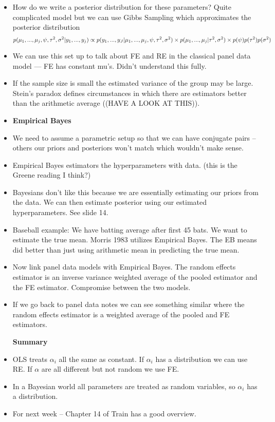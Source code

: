 \documentclass[12pt]{article}
\begin{document}
\begin{itemize}
      \item How do we write a posterior distribution for these parameters?
            Quite complicated model but we can use Gibbs Sampling which approximates the posterior distribution
            $$p(\mu_{1}, ..., \mu_{j}, \psi, \tau^{2}, \sigma^{2}|y_{1}, ..., y_{j}) \propto \\\\
                  p(y_{1}, ..., y_{J}|\mu_{1}, ..., \mu_{j}, \psi, \tau^{2}, \sigma^{2}) \times p(\mu_{1}, ..., \mu_{j}|\tau^{2}, \sigma^{2}) \times p(\psi)p(\tau^{2})p(\sigma^{2})$$

      \item We can use this set up to talk about FE and RE in the classical panel data model --- FE has constant mu's. Didn't understand this fully.
      \item If the sample size is small the estimated variance of the group may be large. Stein's paradox defines circumstances in which there are estimators better than the arithmetic average ((HAVE A LOOK AT THIS)).
      \item \textbf{Empirical Bayes}
      \item We need to assume a parametric setup so that we can have conjugate pairs -- others our priors and posteriors won't match which wouldn't make sense.
      \item Empirical Bayes estimators the hyperparameters with data. (this is the Greene reading I think?)
      \item Bayesians don't like this because we are essentially estimating our priors from the data.
            We can then estimate posterior using our estimated hyperparameters. See slide 14.

      \item Baseball example: We have batting average after first 45 bats. We want to estimate the true mean.
            Morris 1983 utilizes Empirical Bayes. The EB means did better than just using arithmetic mean in predicting the true mean.

      \item Now link panel data models with Empirical Bayes. The random effects estimator is an inverse variance weighted average of the pooled estimator and the FE estimator.
            Compromise between the two models.

      \item If we go back to panel data notes we can see something similar where the random effects estimator is a weighted average of the pooled and FE estimators.

            \textbf{Summary}

      \item OLS treats $\alpha_{i}$ all the same as constant. If $\alpha_{i}$ has a distribution we can use RE. If $\alpha$ are all different but not random we use FE.
      \item In a Bayesian world all parameters are treated as random variables, so $\alpha_{i}$ has a distribution.

      \item For next week -- Chapter 14 of Train has a good overview.
\end{itemize}
\end{document}
